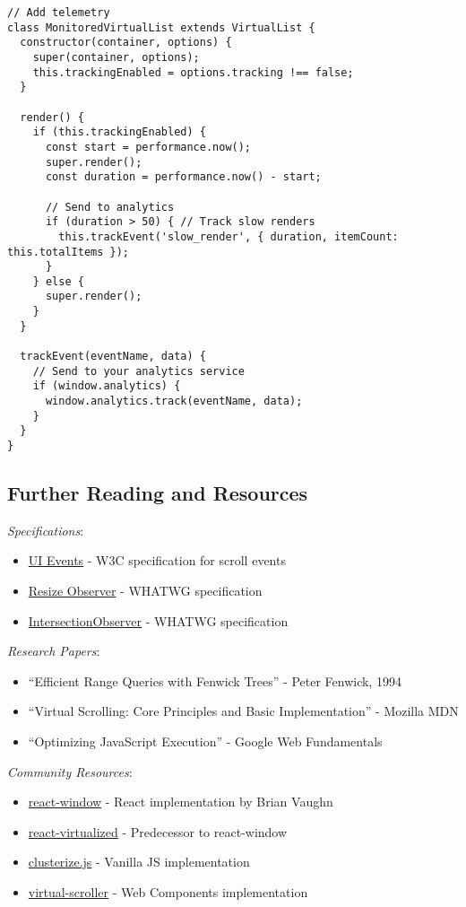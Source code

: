 \documentclass[11pt]{article}
\begin{document}
\begin{verbatim}
// Add telemetry
class MonitoredVirtualList extends VirtualList {
  constructor(container, options) {
    super(container, options);
    this.trackingEnabled = options.tracking !== false;
  }
  
  render() {
    if (this.trackingEnabled) {
      const start = performance.now();
      super.render();
      const duration = performance.now() - start;
      
      // Send to analytics
      if (duration > 50) { // Track slow renders
        this.trackEvent('slow_render', { duration, itemCount: this.totalItems });
      }
    } else {
      super.render();
    }
  }
  
  trackEvent(eventName, data) {
    // Send to your analytics service
    if (window.analytics) {
      window.analytics.track(eventName, data);
    }
  }
}
\end{verbatim}
\subsection{Further Reading and Resources}
\label{sec:org45a8fed}

\emph{Specifications}:
\begin{itemize}
\item \href{https://www.w3.org/TR/uievents/}{UI Events} - W3C specification for scroll events
\item \href{https://www.w3.org/TR/resize-observer/}{Resize Observer} - WHATWG specification
\item \href{https://www.w3.org/TR/intersection-observer/}{IntersectionObserver} - WHATWG specification
\end{itemize}

\emph{Research Papers}:
\begin{itemize}
\item ``Efficient Range Queries with Fenwick Trees'' - Peter Fenwick, 1994
\item ``Virtual Scrolling: Core Principles and Basic Implementation'' - Mozilla MDN
\item ``Optimizing JavaScript Execution'' - Google Web Fundamentals
\end{itemize}

\emph{Community Resources}:
\begin{itemize}
\item \href{https://github.com/bvaughn/react-window}{react-window} - React implementation by Brian Vaughn
\item \href{https://github.com/bvaughn/react-virtualized}{react-virtualized} - Predecessor to react-window
\item \href{https://github.com/NeXTs/Clusterize.js}{clusterize.js} - Vanilla JS implementation
\item \href{https://github.com/valdrinkoshi/virtual-scroller}{virtual-scroller} - Web Components implementation
\end{itemize}
\end{document}
